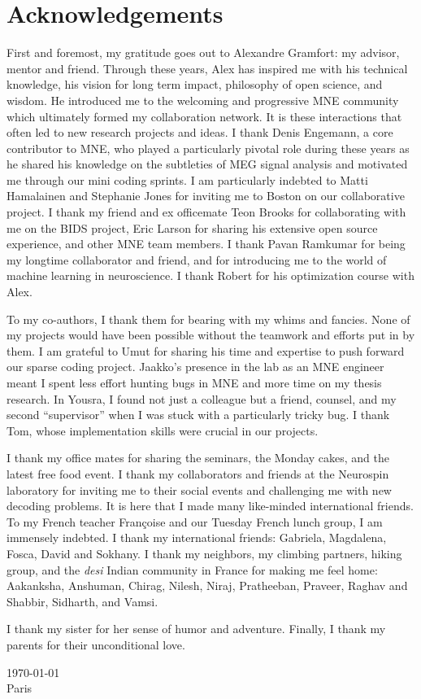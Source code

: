 \chapter*{Acknowledgements}
First and foremost, my gratitude goes out to Alexandre Gramfort: my advisor, mentor and friend. Through these years, Alex has inspired me with his technical knowledge, his vision for long term impact, philosophy of open science, and wisdom. He introduced me to the welcoming and progressive MNE community which ultimately formed my collaboration network. It is these interactions that often led to new research projects and ideas. I thank Denis Engemann, a core contributor to MNE, who played a particularly pivotal role during these years as he shared his knowledge on the subtleties of MEG signal analysis and motivated me through our mini coding sprints. I am particularly indebted to Matti Hamalainen and Stephanie Jones for inviting me to Boston on our collaborative project. I thank my friend and ex officemate Teon Brooks for collaborating with me on the BIDS project, Eric Larson for sharing his extensive open source experience, and other MNE team members. I thank Pavan Ramkumar for being my longtime collaborator and friend, and for introducing me to the world of machine learning in neuroscience. I thank Robert for his optimization course with Alex.

To my co-authors, I thank them for bearing with my whims and fancies. None of my projects would have been possible without the teamwork and efforts put in by them. I am grateful to Umut for sharing his time and expertise to push forward our sparse coding project. Jaakko's presence in the lab as an MNE engineer meant I spent less effort hunting bugs in MNE and more time on my thesis research. In Yousra, I found not just a colleague but a friend, counsel, and my second ``supervisor'' when I was stuck with a particularly tricky bug. I thank Tom, whose implementation skills were crucial in our projects. 

I thank my office mates for sharing the seminars, the Monday cakes, and the latest free food event. I thank my collaborators and friends at the Neurospin laboratory for inviting me to their social events and challenging me with new decoding problems. It is here that I made many like-minded international friends. To my French teacher Françoise and our Tuesday French lunch group, I am immensely indebted. I thank my international friends: Gabriela, Magdalena, Fosca, David and Sokhany. I thank my neighbors, my climbing partners, hiking group, and the \textit{desi} Indian community in France for making me feel home: Aakanksha, Anshuman, Chirag, Nilesh, Niraj, Pratheeban, Praveer, Raghav and Shabbir, Sidharth, and Vamsi.

I thank my sister for her sense of humor and adventure. Finally, I thank my parents for their unconditional love.

\today \\
Paris
